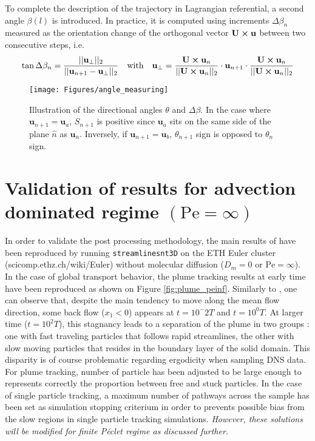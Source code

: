 To complete the description of the trajectory in Lagrangian referential, a second angle $\beta(l)$ is introduced. In practice, it is computed using increments $\Delta \beta_n$ measured as the orientation change of the orthogonal vector $\textbf{U}\cross \textbf{u}$ between two consecutive steps, i.e.
\begin{equation}
\tan\Delta\beta_n = \frac{||\textbf{u}_\perp||_2}{||\textbf{u}_{n+1}-\textbf{u}_\perp||_2}
\quad\textrm{with}\quad
\textbf{u}_\perp =\frac{\textbf{U}\cross\textbf{u}_{n}}{||\textbf{U}\cross\textbf{u}_n||_2}\cdot \textbf{u}_{n+1}\cdot\frac{\textbf{U}\cross\textbf{u}_{n}}{||\textbf{U}\cross\textbf{u}_n||_2}
\end{equation}

\begin{figure}
	\centering
	\texttt{[image: Figures/angle\_measuring]}
	\caption{Illustration of the directional angles $\theta$ and $\Delta \beta$. In the case where $\textbf{u}_{n+1} = \textbf{u}_a$, $S_{n+1}$ is positive since $\textbf{u}_a$ sits on the same side of the plane $\hat{n}$ as $\textbf{u}_n$. Inversely, if $\textbf{u}_{n+1} = \textbf{u}_b$, $\theta_{n+1}$ sign is opposed to $\theta_n$ sign. }
	\label{fig:anglemeasuring}
\end{figure}


\section{Validation of \cite{Meyer2016} results for advection dominated regime $(\mathrm{Pe}=\infty)$}
In order to validate the post processing methodology, the main results of \cite{Meyer2016} have been reproduced by running \texttt{streamlinesnt3D} on the ETH Euler cluster (scicomp.ethz.ch/wiki/Euler) without molecular diffusion ($D_m=0$ or $\mathrm{Pe}=\infty$).\\ 

In the case of global transport behavior, the plume tracking results at early time have been reproduced as shown on Figure \ref{fig:plume_peinf}. 
Similarly to \cite{Meyer2016}, one can observe that, despite the main tendency to move along the mean flow direction, some back flow ($x_1<0$) appears at $t=10^-2T$ and $t=10^0T$. 
At larger time ($t=10^2T$), this stagnancy leads to a separation of the plume in two groups : one with fast traveling particles that follows rapid streamlines, the other with slow moving particles that resides in the boundary layer of the solid domain.
This disparity is of course problematic regarding ergodicity when sampling DNS data.
For plume tracking, number of particle has been adjusted to be large enough to represents correctly the proportion between free and stuck particles.
In the case of single particle tracking, a maximum number of pathways across the sample has been set as simulation stopping criterium in order to prevents possible bias from the slow regions in single particle tracking simulations.
\textit{However, these solutions will be modified for finite Péclet regime as discussed further. }

